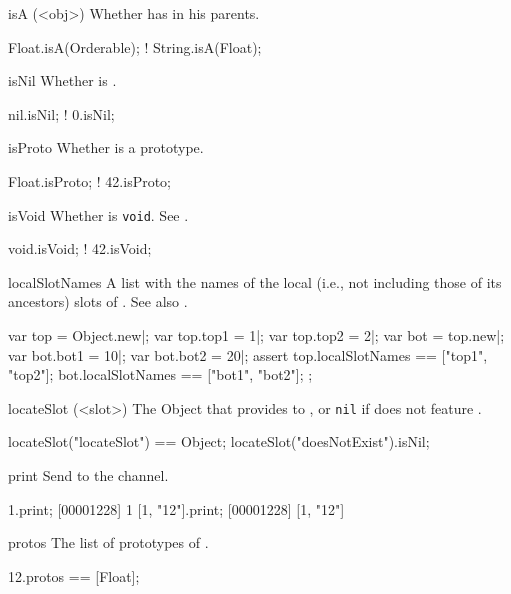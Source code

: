 \begin{urbiscriptapi}
\item[isA](<obj>)%
  Whether \this has  in his parents.
\begin{urbiassert}
   Float.isA(Orderable);
! String.isA(Float);
\end{urbiassert}

\item[isNil]%
  Whether \this is .
\begin{urbiassert}
 nil.isNil;
!  0.isNil;
\end{urbiassert}

\item[isProto]
  Whether \this is a prototype.
\begin{urbiassert}
 Float.isProto;
!   42.isProto;
\end{urbiassert}

\item[isVoid]%
  Whether \this is \lstinline|void|.  See .
\begin{urbiassert}
void.isVoid;
! 42.isVoid;
\end{urbiassert}

\item[localSlotNames]%
  A list with the names of the local (i.e., not including those of its
  ancestors) slots of \this.  See also .
\begin{urbiscript}
var top = Object.new|;
var top.top1 = 1|;
var top.top2 = 2|;
var bot = top.new|;
var bot.bot1 = 10|;
var bot.bot2 = 20|;
assert
{
  top.localSlotNames == ["top1", "top2"];
  bot.localSlotNames == ["bot1", "bot2"];
};
\end{urbiscript}

\item[locateSlot](<slot>)%
  The Object that provides  to \this, or \lstinline|nil| if \this
  does not feature .
\begin{urbiassert}
locateSlot("locateSlot") == Object;
locateSlot("doesNotExist").isNil;
\end{urbiassert}

\item[print] Send \this to the  channel.
\begin{urbiscript}
1.print;
[00001228] 1
[1, "12"].print;
[00001228] [1, "12"]
\end{urbiscript}

\item[protos]
  The list of prototypes of \this.
\begin{urbiassert}
12.protos == [Float];
\end{urbiassert}


\end{urbiscriptapi}
